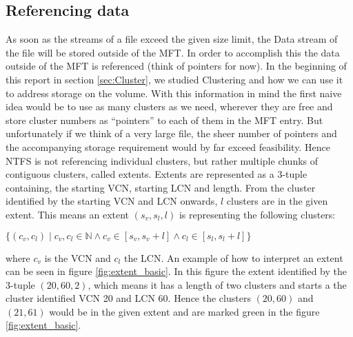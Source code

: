 \subsection{Referencing data}
As soon as the streams of a file exceed the given size limit, the Data stream of the file will be stored outside of the MFT. In order to accomplish this the data outside of the MFT is referenced (think of pointers for now). In the beginning of this report in section \ref{sec:Cluster}, we studied Clustering and how we can use it to address storage on the volume. With this information in mind the first naive idea would be to use as many clusters as we need, wherever they are free and store cluster numbers as ``pointers'' to each of them in the MFT entry. But unfortunately if we think of a very large file, the sheer number of pointers and the accompanying storage requirement would by far exceed feasibility. Hence NTFS is not referencing individual clusters, but rather multiple chunks of contiguous clusters, called extents. Extents are represented as a 3-tuple containing, the starting VCN, starting LCN and length. From the cluster identified by the starting VCN and LCN onwards, $l$ clusters are in the given extent. This means an extent $(s_v, s_l, l)$ is representing the following clusters:
\begin{center}
	$\{(c_v, c_l) \mid c_v, c_l \in \mathbb{N} \wedge c_v \in [s_v, s_v + l] \wedge c_l \in [s_l, s_l + l]\}$
\end{center}
where $c_v$ is the VCN and $c_l$ the LCN.\cite{miller:2013:CNS} An example of how to interpret an extent can be seen in figure \ref{fig:extent_basic}. In this figure the extent identified by the 3-tuple $(20, 60, 2)$, which means it has a length of two clusters and starts a the cluster identified VCN 20 and LCN 60. Hence the clusters $(20, 60)$ and $(21, 61)$ would be in the given extent and are marked green in the figure \ref{fig:extent_basic}.
